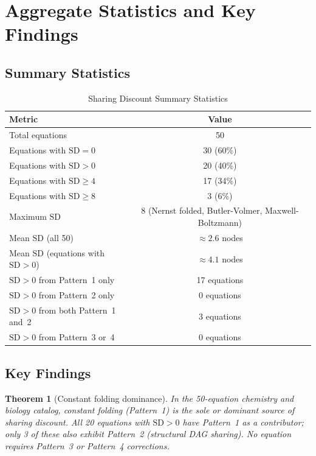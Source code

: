\documentclass[12pt,a4paper]{article}
\newtheorem{theorem}{Theorem}[section]
\theoremstyle{definition}
\newcommand{\SD}{\mathrm{SD}}
\begin{document}
\section{Aggregate Statistics and Key Findings}
\label{sec:stats}

\subsection{Summary Statistics}

\begin{table}[ht]
\centering
\caption{Sharing Discount Summary Statistics}
\label{tab:sdstats}
\begin{tabular}{lc}
\toprule
\textbf{Metric} & \textbf{Value} \\
\midrule
Total equations & 50 \\
Equations with $\SD = 0$ & 30 (60\%) \\
Equations with $\SD > 0$ & 20 (40\%) \\
Equations with $\SD \geq 4$ & 17 (34\%) \\
Equations with $\SD \geq 8$ & 3 (6\%) \\
\midrule
Maximum $\SD$ & 8 (Nernst folded, Butler-Volmer, Maxwell-Boltzmann) \\
Mean $\SD$ (all 50) & $\approx 2.6$ nodes \\
Mean $\SD$ (equations with $\SD > 0$) & $\approx 4.1$ nodes \\
\midrule
$\SD > 0$ from Pattern~1 only & 17 equations \\
$\SD > 0$ from Pattern~2 only & 0 equations \\
$\SD > 0$ from both Pattern~1 and~2 & 3 equations \\
$\SD > 0$ from Pattern~3 or~4 & 0 equations \\
\bottomrule
\end{tabular}
\end{table}

\subsection{Key Findings}

\begin{theorem}[Constant folding dominance]\label{thm:cf-dominance}
In the 50-equation chemistry and biology catalog, constant folding (Pattern~1)
is the sole or dominant source of sharing discount.  All 20 equations with
$\SD > 0$ have Pattern~1 as a contributor; only 3 of these also exhibit
Pattern~2 (structural DAG sharing).  No equation requires Pattern~3 or
Pattern~4 corrections.
\end{theorem}
\end{document}
